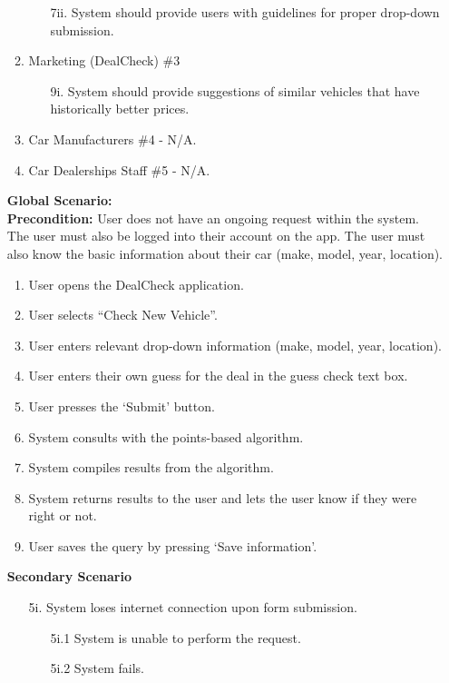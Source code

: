 \documentclass[]{article}
\begin{document}
\begin{enumerate}[{\bf {BE}1.}]
\begin{enumerate}[{\bf VP1.}]
\begin{enumerate}
          \item[7ii.] System should provide users with guidelines for proper drop-down submission.
        \end{enumerate}
      \item Marketing (DealCheck) \#3
        \begin{enumerate}
          \item[9i.] System should provide suggestions of similar vehicles that have historically better prices.
        \end{enumerate}
      \item Car Manufacturers \#4 - N/A.
      \item Car Dealerships Staff \#5 - N/A.
    \end{enumerate}
    
    \textbf{Global Scenario:} \\
    \textbf{Precondition:} User does not have an ongoing request within the system. The user must also be logged into their account on the app. The user must also know the basic information about their car (make, model, year, location).
    \begin{enumerate}[{\bf 1.}]
      \item User opens the DealCheck application.
      \item User selects “Check New Vehicle”.
      \item User enters relevant drop-down information (make, model, year, location).
      \item User enters their own guess for the deal in the guess check text box.
      \item User presses the ‘Submit’ button.
      \item System consults with the points-based algorithm.
      \item System compiles results from the algorithm.
      \item System returns results to the user and lets the user know if they were right or not.
      \item User saves the query by pressing ‘Save information’.
    \end{enumerate}
    \textbf{Secondary Scenario}
    \begin{enumerate}
      \item[5i.] System loses internet connection upon form submission.
      \begin{enumerate}
        \item[5i.1] System is unable to perform the request.
        \item[5i.2] System fails.

\end{enumerate}
\end{enumerate}
\end{enumerate}
\end{document}
